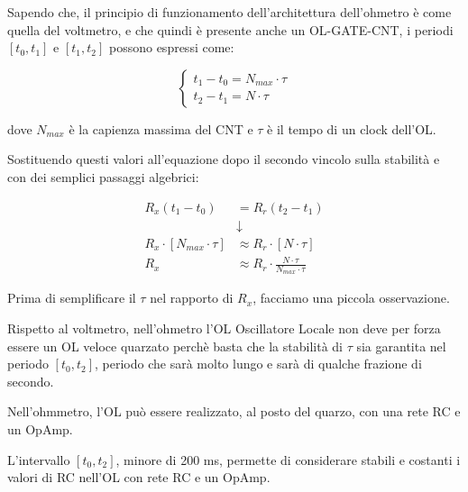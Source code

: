 Sapendo che, il principio di funzionamento dell'architettura dell'ohmetro è come quella del voltmetro, 
e che quindi è presente anche un OL-GATE-CNT, 
i periodi $[t_0, t_1]$ e $[t_1, t_2]$ possono espressi come: 

{
    \Large 
    \begin{equation}
        \begin{cases}
            t_1 - t_0 = N_{max} \cdot \tau 
            \\
            t_2 - t_1 = N \cdot \tau
        \end{cases}
    \end{equation}
}

dove $N_{max}$ è la capienza massima del CNT e $\tau$ è il tempo di un clock dell'OL. \newline 

Sostituendo questi valori all'equazione dopo il secondo vincolo sulla stabilità e con dei semplici passaggi algebrici: 

{
    \Large 
    \begin{equation}
        \begin{split}
        R_x (t_1 - t_0)
        &= 
        R_r (t_2 - t_1)   
        \\ 
        &\downarrow
        \\
        R_x \cdot [N_{max} \cdot \tau ]
        &\approx 
        R_r \cdot [N \cdot \tau]
        \\
        R_x 
        &\approx 
        R_r \cdot \frac{N \cdot \tau}{N_{max} \cdot \tau}
        \end{split}
    \end{equation}
}

Prima di semplificare il $\tau$ nel rapporto di $R_x$, 
facciamo una piccola osservazione. \newline 

Rispetto al voltmetro, nell'ohmetro l'OL Oscillatore Locale non deve per forza essere un OL veloce quarzato 
perchè basta che la stabilità di $\tau$ sia garantita nel periodo $[t_0, t_2]$, 
periodo che sarà molto lungo e sarà di qualche frazione di secondo. \newline

Nell'ohmmetro, l'OL può essere realizzato, al posto del quarzo, con una rete RC e un OpAmp. \newline 

L'intervallo $[t_0, t_2]$, minore di 200 ms, permette di considerare stabili e costanti i valori di RC nell'OL 
con rete RC e un OpAmp. \newline 

